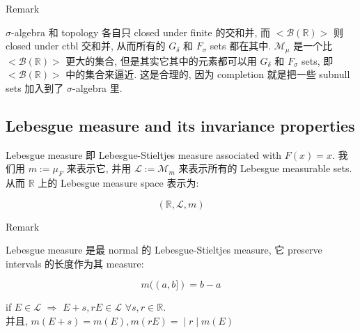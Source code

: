 \begin{qlremark}{Remark}

\(\sigma\)-algebra 和 topology 各自只 closed under finite 的交和并, 而 \(< \mathcal{B}(\mathbb{R}) >\) 则 closed under ctbl 交和并, 从而所有的 \(G_{\delta}\) 和 \(F_{\sigma}\) sets 都在其中. \(\mathcal{M}_{\mu}\) 是一个比 \(< \mathcal{B}(\mathbb{R}) >\) 更大的集合, 但是其实它其中的元素都可以用 \(G_{\delta}\) 和 \(F_{\sigma}\) sets, 即 \(< \mathcal{B}(\mathbb{R}) >\) 中的集合来逼近. 这是合理的, 因为 completion 就是把一些 subnull sets 加入到了 \(\sigma\)-algebra 里.

\end{qlremark}

\subsection{Lebesgue measure and its invariance properties}\label{lebesgue-measure-and-its-invariance-properties}

\begin{definition}{}

Lebesgue measure 即 Lebesgue-Stieltjes measure associated with \(F(x) = x\). 我们用 \(m := \mu_{F}\) 来表示它, 并用 \(\mathcal{L} := \mathcal{M}_{m}\) 来表示所有的 Lebesgue measurable sets.\\
从而 \(\mathbb{R}\) 上的 Lebesgue measure space 表示为:

\[(\mathbb{R},\mathcal{L},m)\]

\end{definition}

\begin{qlremark}{Remark}

Lebesgue measure 是最 normal 的 Lebesgue-Stieltjes measure, 它 preserve intervals 的长度作为其 measure:

\[m((a,b\rbrack) = b - a\]

\end{qlremark}

\begin{theorem}{}

if \(E \in \mathcal{L}\) \(\Rightarrow\) \(E + s,rE \in \mathcal{L}\) \(\forall s,r \in \mathbb{R}\).\\
并且, \(\left. m(E + s) = m(E),m(rE) = \middle| r \middle| m(E) \right.\)

\end{theorem}

